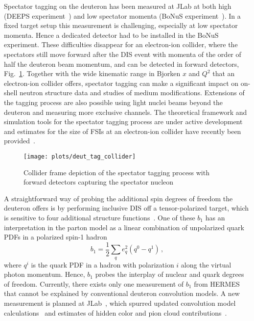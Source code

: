 Spectator tagging on the deuteron has been measured at JLab at both high (DEEPS experiment~\cite{Klimenko:2005zz}) and low spectator momenta (BoNuS experiment~\cite{Baillie:2011za}). In a fixed target setup this measurement is challenging, especially at low spectator momenta. Hence a dedicated detector had to be installed in the BoNuS experiment.  These difficulties disappear for an electron-ion collider, where the spectators still move forward after the DIS event with momenta of the order of half the deuteron beam momentum, and can be detected in forward detectors, Fig.~\ref{fig:collider}.  Together with the wide kinematic range in Bjorken $x$ and $Q^2$ that an electron-ion collider offers, spectator tagging can make a significant impact on on-shell neutron structure data and studies of medium modifications.  Extensions of the tagging process are also possible using light nuclei beams beyond the deuteron and measuring more exclusive channels.  The theoretical framework and simulation tools for the spectator tagging process are under active development~\cite{deutLDRD,Guzey:2014jva,Cosyn:2016oiq} and estimates for the size of FSIs at an electron-ion collider have recently been provided~\cite{Strikman:2017koc}.
%
    \begin{figure}[tbp]
        \texttt{[image: plots/deut\_tag\_collider]}
        \caption{Collider frame depiction of the spectator tagging process with forward detectors capturing the spectator nucleon~\cite{deutLDRD}}
        \label{fig:collider}
    \end{figure}
%
A straightforward way of probing the additional spin degrees of freedom the deuteron offers is by performing inclusive DIS off a tensor-polarized target, which is sensitive to four additional structure functions~\cite{Hoodbhoy:1988am}.  One of these $b_1$ has an interpretation in the parton model as a linear combination of unpolarized quark PDFs in a polarized spin-1 hadron
\begin{equation}
b_1=\frac{1}{2}\sum_q e_q^2(q^0-q^1)\,,
\end{equation}
where $q^i$ is the quark PDF in a hadron with polarization $i$ along the virtual photon momentum.  Hence, $b_1$ probes the interplay of nuclear and quark degrees of freedom.  Currently, there exists only one measurement of $b_1$ from HERMES~\cite{Airapetian:2005cb} that cannot be explained by conventional deuteron convolution models.  A new measurement is planned at JLab~\cite{Slifer:2013vma}, which spurred updated convolution model calculations~\cite{Cosyn:2017fbo} and estimates of hidden color and pion cloud contributions~\cite{Miller:2013hla}.
